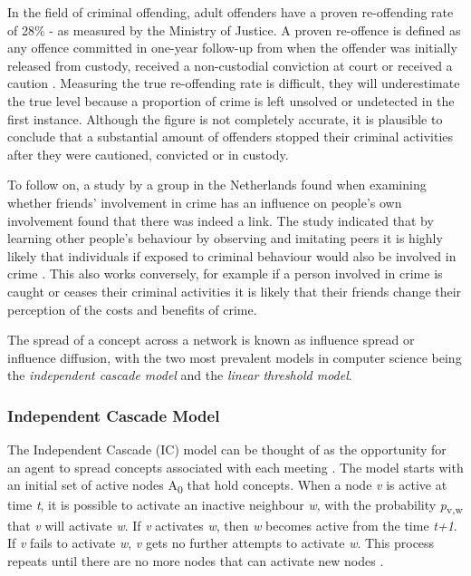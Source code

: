 \documentclass[11pt]{informatics-report}
\begin{document}
In the field of criminal offending, adult offenders have a proven re-offending rate of 28\% - as measured by the Ministry of Justice. A proven re-offence is defined as any offence committed in one-year follow-up from when the offender was initially released from custody, received a non-custodial conviction at court or received a caution \cite{moj20}. Measuring the true re-offending rate is difficult, they will underestimate the true level because a proportion of crime is left unsolved or undetected in the first instance. Although the figure is not completely accurate, it is plausible to conclude that a substantial amount of offenders stopped their criminal activities after they were cautioned, convicted or in custody. \par

To follow on, a study by a group in the Netherlands found when examining whether friends' involvement in crime has an influence on people's own involvement found that there was indeed a link. The study indicated that by learning other people's behaviour by observing and imitating peers it is highly likely that individuals if exposed to criminal behaviour would also be involved in crime \cite{deter}. This also works conversely, for example if a person involved in crime is caught or ceases their criminal activities it is likely that their friends change their perception of the costs and benefits of crime. \par

The spread of a concept across a network is known as influence spread or influence diffusion, with the two most prevalent models in computer science being the \emph{independent cascade model} and the \emph{linear threshold model}. \par

\subsubsection{Independent Cascade Model}
The Independent Cascade (IC) model can be thought of as the opportunity for an agent to spread concepts associated with each meeting \cite{icmodel}. The model starts with an initial set of active nodes A\textsubscript{0} that hold concepts. When a node \emph{v} is active at time \emph{t}, it is possible to activate an inactive neighbour \emph{w}, with the probability \emph{p}\textsubscript{v,w} that \emph{v} will activate \emph{w}. If \emph{v} activates \emph{w}, then \emph{w} becomes active from the time \emph{t+1}. If \emph{v} fails to activate \emph{w}, \emph{v} gets no further attempts to activate \emph{w}. This process repeats until there are no more nodes that can activate new nodes \cite{ic2}. \par
\end{document}
